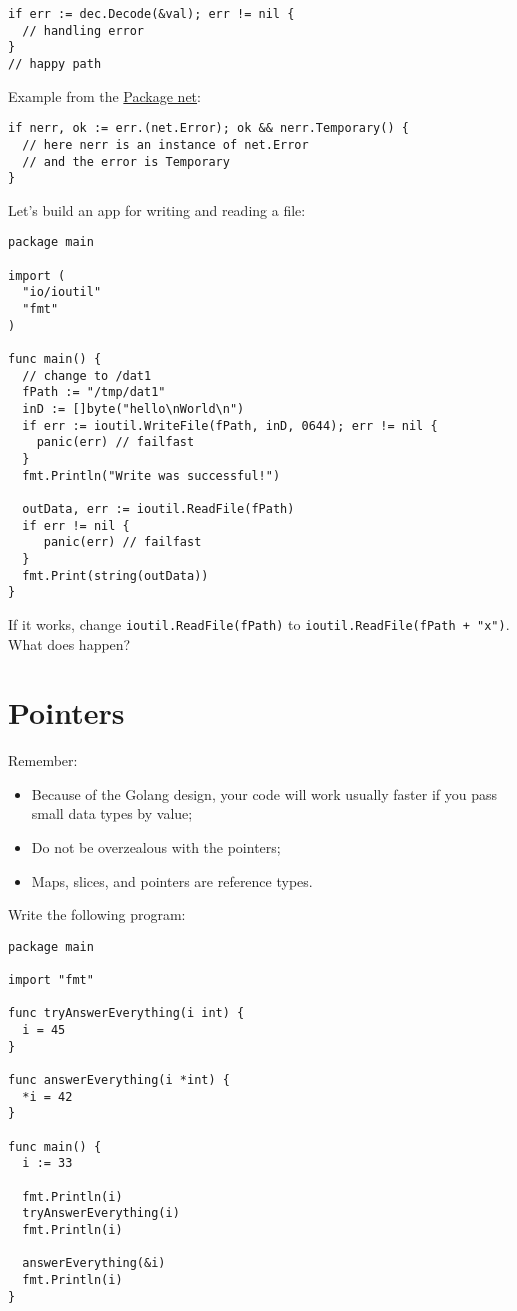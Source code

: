 \documentclass[11pt, letterpaper]{article}
\begin{document}
\begin{verbatim}
if err := dec.Decode(&val); err != nil {
  // handling error
}
// happy path
\end{verbatim}

Example from the \href{https://golang.org/src/net/net.go}{Package net}:

\begin{verbatim}
if nerr, ok := err.(net.Error); ok && nerr.Temporary() {
  // here nerr is an instance of net.Error
  // and the error is Temporary
}
\end{verbatim}

Let's build an app for writing and reading a file:

\begin{verbatim}
package main

import (
  "io/ioutil"
  "fmt"
)

func main() {
  // change to /dat1
  fPath := "/tmp/dat1"
  inD := []byte("hello\nWorld\n")
  if err := ioutil.WriteFile(fPath, inD, 0644); err != nil {
    panic(err) // failfast
  }
  fmt.Println("Write was successful!")

  outData, err := ioutil.ReadFile(fPath)
  if err != nil {
     panic(err) // failfast
  }
  fmt.Print(string(outData))
}
\end{verbatim}

If it works, change \texttt{ioutil.ReadFile(fPath)} to \texttt{ioutil.ReadFile(fPath + "x")}. What does happen?


\section{Pointers}

Remember:

\begin{itemize}
\item Because of the Golang design, your code will work usually faster if you pass small data types by value;
\item Do not be overzealous with the pointers;
\item Maps, slices, and pointers are reference types.
\end{itemize}

Write the following program:

\begin{verbatim}
package main

import "fmt"

func tryAnswerEverything(i int) {
  i = 45
}

func answerEverything(i *int) {
  *i = 42
}

func main() {
  i := 33

  fmt.Println(i)
  tryAnswerEverything(i)
  fmt.Println(i)

  answerEverything(&i)
  fmt.Println(i)
}
\end{verbatim}
\end{document}
